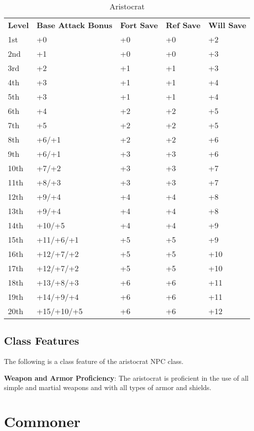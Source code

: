 \begin{table}[]
\sffamily
\caption{Aristocrat}
\begin{tabular}{lllll}
\textbf{Level} & \textbf{Base Attack Bonus} & \textbf{Fort Save} & \textbf{Ref Save} & \textbf{Will Save}\\
1st & +0 & +0 & +0 & +2\\
2nd & +1 & +0 & +0 & +3\\
3rd & +2 & +1 & +1 & +3\\
4th & +3 & +1 & +1 & +4\\
5th & +3 & +1 & +1 & +4\\
6th & +4 & +2 & +2 & +5\\
7th & +5 & +2 & +2 & +5\\
8th & +6/+1 & +2 & +2 & +6\\
9th & +6/+1 & +3 & +3 & +6\\
10th & +7/+2 & +3 & +3 & +7\\
11th & +8/+3 & +3 & +3 & +7\\
12th & +9/+4 & +4 & +4 & +8\\
13th & +9/+4 & +4 & +4 & +8\\
14th & +10/+5 & +4 & +4 & +9\\
15th & +11/+6/+1 & +5 & +5 & +9\\
16th & +12/+7/+2 & +5 & +5 & +10\\
17th & +12/+7/+2 & +5 & +5 & +10\\
18th & +13/+8/+3 & +6 & +6 & +11\\
19th & +14/+9/+4 & +6 & +6 & +11\\
20th & +15/+10/+5 & +6 & +6 & +12\\
\end{tabular}
\end{table}

\subsection{Class Features}

				
The following is a class feature of the aristocrat NPC class.
				
\textbf{Weapon and Armor Proficiency}: The aristocrat is proficient in the use of all simple and martial weapons and with all types of armor and shields.
				
\section{Commoner}

